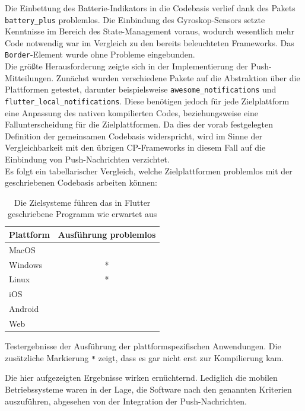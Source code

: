 \documentclass[a4paper]{scrartcl}
\newcommand{\xmark}{\ding{55}}
\begin{document}
Die Einbettung des Batterie-Indikators in die Codebasis verlief dank des Pakets \texttt{battery\_plus} problemlos. Die Einbindung des Gyroskop-Sensors setzte Kenntnisse im Bereich des State-Management voraus, wodurch wesentlich mehr Code notwendig war im Vergleich zu den bereits beleuchteten Frameworks. Das \texttt{Border}-Element wurde ohne Probleme eingebunden. \\
Die größte Herausforderung zeigte sich in der Implementierung der Push-Mitteilungen. Zunächst wurden verschiedene Pakete auf die Abstraktion über die Plattformen getestet, darunter beispielsweise \texttt{awesome\_notifications} und \texttt{flutter\_local\_notifications}. Diese benötigen jedoch für jede Zielplattform eine Anpassung des nativen kompilierten Codes, beziehungsweise eine Fallunterscheidung für die Zielplattformen. Da dies der vorab festgelegten Definition der gemeinsamen Codebasis widerspricht, wird im Sinne der Vergleichbarkeit mit den übrigen CP-Frameworks in diesem Fall auf die Einbindung von Push-Nachrichten verzichtet. \\

Es folgt ein tabellarischer Vergleich, welche Zielplattformen problemlos mit der geschriebenen Codebasis arbeiten können:

\begin{table}[H]
	\centering
 	\caption{Die Zielsysteme führen das in Flutter geschriebene Programm wie erwartet aus}
 	\begin{center}
 		\begin{tabular}{| l | c |}
 			\hline
 			\textbf{Plattform} & \textbf{Ausführung problemlos} \\
 			\hline \hline
			MacOS & \xmark \\
 			\hline
 			Windows & \xmark * \\
 			\hline
 			Linux & \xmark * \\
 			\hline
 			iOS & \Checkmark \\
 			\hline
 			Android & \Checkmark \\
 			\hline
 			Web & \xmark \\
 			\hline
 		\end{tabular}
 	\end{center}
 	\justifying
	\small	
 	Testergebnisse der Ausführung der plattformspezifischen Anwendungen. Die zusätzliche Markierung \texttt{*} zeigt, dass es gar nicht erst zur Kompilierung kam.
\end{table}

Die hier aufgezeigten Ergebnisse wirken ernüchternd. Lediglich die mobilen Betriebssysteme waren in der Lage, die Software nach den genannten Kriterien auszuführen, abgesehen von der Integration der Push-Nachrichten. \\
\end{document}
